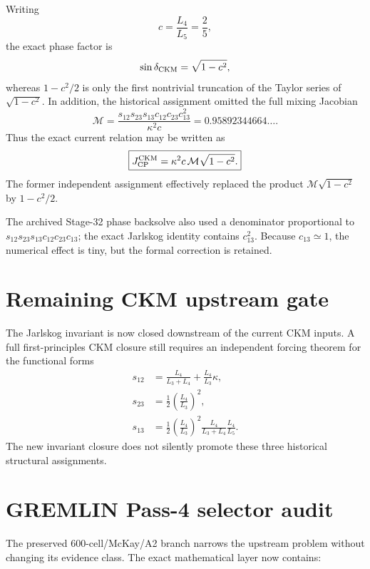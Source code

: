 Writing
\[
c=\frac{L_4}{L_5}=\frac25,
\]
the exact phase factor is
\[
\sin\delta_{\rm CKM}=\sqrt{1-c^2},
\]
whereas $1-c^2/2$ is only the first nontrivial truncation of the Taylor series
of $\sqrt{1-c^2}$.  In addition, the historical assignment omitted the full
mixing Jacobian
\begin{equation}
\mathcal M
=\frac{s_{12}s_{23}s_{13}c_{12}c_{23}c_{13}^2}{\kappa^2c}
=0.95892344664\ldots .
\label{eq:v12-ckm-mixing-jacobian}
\end{equation}
Thus the exact current relation may be written as
\begin{equation}
\boxed{
J_{\rm CP}^{\rm CKM}
=\kappa^2c\,\mathcal M\sqrt{1-c^2}.
}
\label{eq:v12-ckm-j-factorized}
\end{equation}
The former independent assignment effectively replaced the product
$\mathcal M\sqrt{1-c^2}$ by $1-c^2/2$.

The archived Stage-32 phase backsolve also used a denominator proportional to
$s_{12}s_{23}s_{13}c_{12}c_{23}c_{13}$; the exact Jarlskog identity contains
$c_{13}^2$.  Because $c_{13}\simeq1$, the numerical effect is tiny, but the
formal correction is retained.

\section{Remaining CKM upstream gate}
The Jarlskog invariant is now closed downstream of the current CKM inputs.  A
full first-principles CKM closure still requires an independent forcing theorem
for the functional forms
\begin{equation}
\boxed{
\begin{aligned}
s_{12}
&=\frac{L_4}{L_3+L_4}+\frac{L_4}{L_3}\kappa,\\
s_{23}
&=\frac12\left(\frac{L_4}{L_3}\right)^2,\\
s_{13}
&=\frac12\left(\frac{L_4}{L_3}\right)^2
\frac{L_4}{L_3+L_4}\frac{L_4}{L_5}.
\end{aligned}
}
\label{eq:v12-ckm-upstream-open}
\end{equation}
The new invariant closure does not silently promote these three historical
structural assignments.

\section{GREMLIN Pass-4 selector audit}

The preserved 600-cell/McKay/A2 branch narrows the upstream problem without
changing its evidence class.  The exact mathematical layer now contains:


